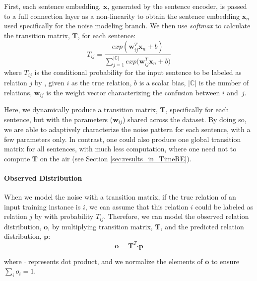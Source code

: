 First, each sentence embedding, $\mathbf{x}$,
generated by the sentence encoder, is passed to a full connection layer as a  non-linearity to obtain the
sentence embedding $\mathbf{x}_n$ used specifically for the noise modeling
branch.
We then use \emph{softmax} to calculate the transition matrix, $\mathbf{T}$, for each sentence:
%
\begin{equation}\label{eq_tm}
T_{ij} = \frac{exp({\mathbf{w}_{ij}^T \mathbf{x}_n + b})}{\sum_{j=1}^{|\mathbb{C}|}{exp({\mathbf{w}_{ij}^T \mathbf{x}_n + b}})}
\end{equation}
where $T_{ij}$ is the conditional probability for the input sentence to be labeled as relation $j$ by \DS, given $i$ as the true relation, $b$ is a scalar bias,  $|\mathbb{C}|$ is the number of relations, $\mathbf{w}_{ij}$ is the weight vector characterizing the confusion between $i$ and~$j$. %

Here, we dynamically produce a transition matrix, $\mathbf{T}$, specifically for each sentence, but with the parameters ($\mathbf{w}_{ij}$) shared across the dataset. By doing so, we are able to adaptively characterize the noise pattern for each sentence, with a few parameters only. In contrast, one could also produce one global transition matrix for all sentences, with much less computation, where one need not to compute $\mathbf{T}$ on the air (see Section \ref{sec:results_in_TimeRE}).


\paragraph{Observed Distribution}
When we model the noise with a transition matrix,
if the true relation of an input training instance is $i$, we can assume that this relation $i$ could be labeled as relation $j$ by \DS  with probability $T_{ij}$. Therefore, we can model the observed relation distribution, $\mathbf{o}$, by
multiplying transition matrix, $\mathbf{T}$, and the predicted relation distribution, $\mathbf{p}$:
 \begin{equation}
\mathbf{o} = \mathbf{T}^T \bm\cdot \mathbf{p}
\label{eq_transition}
 \end{equation}

where $\bm\cdot$ represents dot product, and we normalize the elements of $\mathbf{o}$ to ensure $\sum_i{o_i}=1$.

